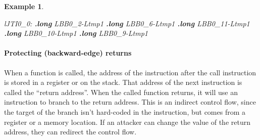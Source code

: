 \documentclass[
  a4paper,
]{report}
\newtheorem{example}{Example}
\newenvironment{Shaded}{}{}
\newcommand{\FunctionTok}[1]{\textcolor[rgb]{0.02,0.16,0.49}{#1}}
\newcommand{\KeywordTok}[1]{\textcolor[rgb]{0.00,0.44,0.13}{\textbf{#1}}}
\newcommand{\NormalTok}[1]{#1}
\newcommand{\OperatorTok}[1]{\textcolor[rgb]{0.40,0.40,0.40}{#1}}
\begin{document}
\begin{example}
\begin{Shaded}
\begin{Highlighting}[]
\FunctionTok{lJTI0\_0:}
  \KeywordTok{.long}\NormalTok{ LBB0\_2}\OperatorTok{{-}}\NormalTok{Ltmp1}
  \KeywordTok{.long}\NormalTok{ LBB0\_6}\OperatorTok{{-}}\NormalTok{Ltmp1}
  \KeywordTok{.long}\NormalTok{ LBB0\_11}\OperatorTok{{-}}\NormalTok{Ltmp1}
  \KeywordTok{.long}\NormalTok{ LBB0\_10}\OperatorTok{{-}}\NormalTok{Ltmp1}
  \KeywordTok{.long}\NormalTok{ LBB0\_9}\OperatorTok{{-}}\NormalTok{Ltmp1}
\end{Highlighting}
\end{Shaded}

\end{example}

\paragraph{Protecting (backward-edge)
returns}\label{protecting-backward-edge-returns}

When a function is called, the address of the instruction after the call
instruction is stored in a register or on the stack. That address of the
next instruction is called the
``\label{__index_entry_43}{return
address}''. When the called function returns, it
will use an instruction to branch to the return address. This is an
indirect control flow, since the target of the branch isn't hard-coded
in the instruction, but comes from a register or a memory location. If
an attacker can change the value of the return address, they can
redirect the control flow.
\end{document}
